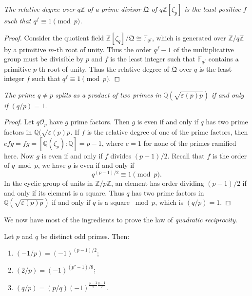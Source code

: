 \begin{lemma}\em
The relative degree over $q\mathbb{Z}$ of a prime divisor $\mathfrak{Q}$ of $q\mathbb{Z}[\zeta_p]$ is the least positive $f$ such that $q^f\equiv 1\pmod{p}$.
\end{lemma}
\begin{proof}
Consider the quotient field $\mathbb{Z}[\zeta_q]/\mathfrak{Q}\cong\mathbb{F}_{q^f}$, which is generated over $\mathbb{Z}/q\mathbb{Z}$ by a primitive $m$-th root of unity. Thus the order $q^f-1$ of the multiplicative group must be divisible by $p$ and $f$ is the least integer such that $\mathbb{F}_{q^f}$ contains a primitive $p$-th root of unity. Thus the relative degree of $\mathfrak{Q}$ over $q$ is the least integer $f$ such that $q^f\equiv 1\pmod{p}$.
\end{proof}
\begin{lemma}\em
The prime $q\ne p$ splits as a product of two primes in $\mathbb{Q}(\sqrt{\varepsilon(p)p})$ if and only if $(q/p)=1$.
\end{lemma}
\begin{proof}
Let $q\mathcal{O}_p$ have $g$ prime factors. Then $g$ is even if and only if $q$ has two prime factors in $\mathbb{Q}(\sqrt{\varepsilon(p)p}$. If $f$ is the relative degree of one of the prime factors, then $efg=fg=[\mathbb{Q}(\zeta_p):\mathbb{Q}]=p-1$, where $e=1$ for none of the primes ramified here. Now $g$ is even if and only if $f$ divides $(p-1)/2$. Recall that $f$ is the order of $q\bmod{p}$, we have $g$ is even if and only if 
$$
q^{(p-1)/2}\equiv 1\pmod{p}.
$$
In the cyclic group of units in $\mathbb{Z}/p\mathbb{Z}$, an element has order dividing $(p-1)/2$ if and only if its element is a square. Thus $q$ has two prime factors in $\mathbb{Q}(\sqrt{\varepsilon(p)p})$ if and only if $q$ is a square $\bmod{p}$, which is $(q/p)=1$.
\end{proof}
We now have most of the ingredients to prove the law of \textit{quadratic reciprocity}.
\begin{theorem}
Let $p$ and $q$ be distinct odd primes. Then: 
\begin{enumerate}
    \item $(-1/p)=(-1)^{(p-1)/2}$;
    \item $(2/p)=(-1)^{(p^2-1)/8}$;
    \item $(q/p)=(p/q)(-1)^{\frac{p-1}{2}\frac{q-1}{2}}$.
\end{enumerate}
\end{theorem}
